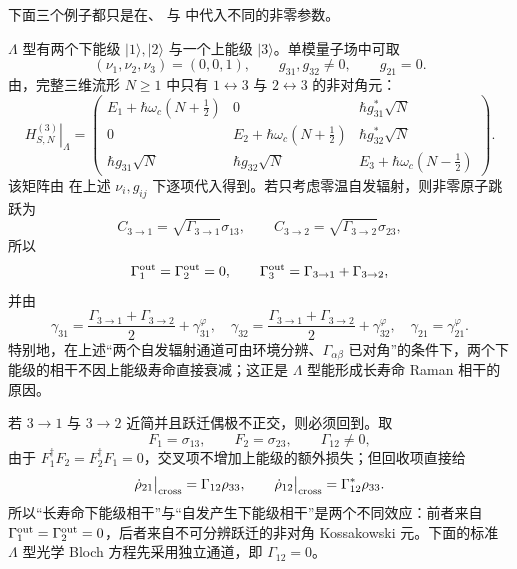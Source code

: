 下面三个例子都只是在、 与 中代入不同的非零参数。

\begin{exbox}[$\Lambda$ 型]
$\Lambda$ 型有两个下能级 $|1\rangle,|2\rangle$ 与一个上能级 $|3\rangle$。单模量子场中可取
\[
(\nu_1,\nu_2,\nu_3)=(0,0,1),
\qquad
g_{31},g_{32}\ne0,
\qquad
g_{21}=0.
\]
由，完整三维流形 $N\ge1$ 中只有 $1\leftrightarrow3$ 与 $2\leftrightarrow3$ 的非对角元：
\[
\left.H_{S,N}^{(3)}\right|_{\Lambda}=
\begin{pmatrix}
E_1+\hbar\omega_c(N+\tfrac12)&0&\hbar g_{31}^*\sqrt N\\
0&E_2+\hbar\omega_c(N+\tfrac12)&\hbar g_{32}^*\sqrt N\\
\hbar g_{31}\sqrt N&\hbar g_{32}\sqrt N&E_3+\hbar\omega_c(N-\tfrac12)
\end{pmatrix}.
\]
该矩阵由 在上述 $\nu_i,g_{ij}$ 下逐项代入得到。若只考虑零温自发辐射，则非零原子跳跃为
\[
C_{3\to1}=\sqrt{\Gamma_{3\to1}}\sigma_{13},
\qquad
C_{3\to2}=\sqrt{\Gamma_{3\to2}}\sigma_{23},
\]
所以
\[
\Gamma_1^{\rm out}=\Gamma_2^{\rm out}=0,
\qquad
\Gamma_3^{\rm out}=\Gamma_{3\to1}+\Gamma_{3\to2},
\]
并由
\[
\gamma_{31}=\frac{\Gamma_{3\to1}+\Gamma_{3\to2}}2+\gamma_{31}^{\varphi},
\quad
\gamma_{32}=\frac{\Gamma_{3\to1}+\Gamma_{3\to2}}2+\gamma_{32}^{\varphi},
\quad
\gamma_{21}=\gamma_{21}^{\varphi}.
\]
特别地，在上述“两个自发辐射通道可由环境分辨、$\Gamma_{\alpha\beta}$ 已对角”的条件下，两个下能级的相干不因上能级寿命直接衰减；这正是 $\Lambda$ 型能形成长寿命 Raman 相干的原因。

若 $3\to1$ 与 $3\to2$ 近简并且跃迁偶极不正交，则必须回到。取
\[
F_1=\sigma_{13},\qquad F_2=\sigma_{23},
\qquad \Gamma_{12}\ne0,
\]
由于 $F_1^\dagger F_2=F_2^\dagger F_1=0$，交叉项不增加上能级的额外损失；但回收项直接给
\begin{equation}
\dot\rho_{21}\big|_{\rm cross}
=\Gamma_{12}\rho_{33},
\qquad
\dot\rho_{12}\big|_{\rm cross}
=\Gamma_{12}^*\rho_{33}.
\label{eq:phys-oqs-lambda-spontaneous-coherence}
\end{equation}
所以“长寿命下能级相干”与“自发产生下能级相干”是两个不同效应：前者来自 $\Gamma_1^{\rm out}=\Gamma_2^{\rm out}=0$，后者来自不可分辨跃迁的非对角 Kossakowski 元。下面的标准 $\Lambda$ 型光学 Bloch 方程先采用独立通道，即 $\Gamma_{12}=0$。


\end{exbox}
